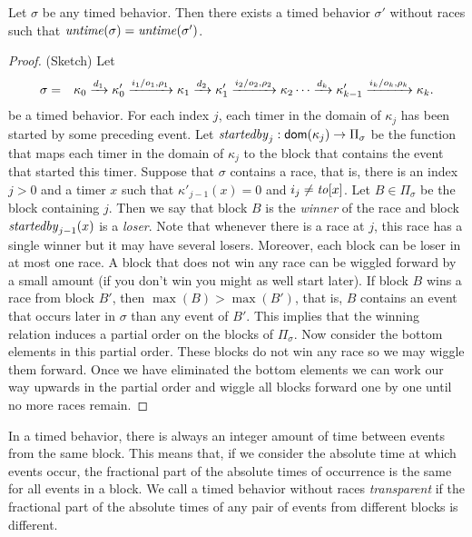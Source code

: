 \begin{lemma}
\label{race elimination}
Let $\sigma$ be any timed behavior.
Then there exists a timed behavior $\sigma'$ without races such that $\mathit{untime}(\sigma)=\mathit{untime}(\sigma')$.
\end{lemma}
\begin{proof}
(Sketch) Let
\begin{eqnarray*}
\sigma & = & \kappa_0 \xrightarrow{d_1} \kappa'_0 \xrightarrow{i_1/o_1, \rho_1} \kappa_1 \xrightarrow{d_2} \kappa'_1 \xrightarrow{i_2/o_2, \rho_2} \kappa_2 \cdots
\xrightarrow{d_k} \kappa'_{k-1} \xrightarrow{i_k/o_k, \rho_k} \kappa_{k}.
\end{eqnarray*}
be a timed behavior.
%
For each index $j$, each timer in the domain of $\kappa_j$ has been started by some preceding event.
Let $\mathit{startedby}_j : {\textsf{dom}}(\kappa_j) \rightarrow \Pi_\sigma$ be the function that maps each timer in
the domain of $\kappa_j$ to the block that contains the event that started this timer.
Suppose that $\sigma$ contains a race, that is, there is an index $j>0$ and a timer $x$  
such that $\kappa'_{j-1}(x) = 0$ and $i_j \neq \mathit{to}[x]$.
Let $B \in \Pi_\sigma$ be the block containing $j$. Then we say that block $B$ is the \emph{winner} of the race and block
$\mathit{startedby}_{j-1}(x)$ is a \emph{loser}.
Note that whenever there is a race at $j$, this race has a single winner but it may have several losers.
Moreover, each block can be loser in at most one race.
A block that does not win any race can be wiggled forward by a small amount (if you don't win you might as well start later).
If block $B$ wins a race from block $B'$, then $\max(B)>\max(B')$, that is, $B$ contains an event that occurs later
in $\sigma$ than any event of $B'$.
This implies that the winning relation induces a partial order on the blocks of $\Pi_\sigma$.
Now consider the bottom elements in this partial order. These blocks do not win any race so we may wiggle them forward.
Once we have eliminated the bottom elements we can work our way upwards in the partial order and wiggle all blocks
forward one by one until no more races remain.
\end{proof}


In a timed behavior, there is always an integer amount of time between events from the same block.
This means that, if we consider the absolute time at which events occur, the fractional part of the absolute times
of occurrence is the same for all events in a block.
We call a timed behavior without races \emph{transparent} if the fractional part of the absolute times of any pair of events from different blocks is different.

